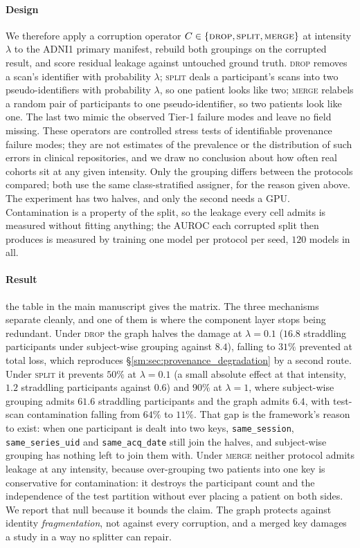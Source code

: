 \documentclass[11pt]{article}
\begin{document}
\paragraph{Design}
We therefore apply a corruption operator
$C \in \{\textsc{drop}, \textsc{split}, \textsc{merge}\}$ at intensity
$\lambda$ to the ADNI1 primary manifest, rebuild both groupings on the
corrupted result, and score residual leakage against untouched ground truth.
\textsc{drop} removes a scan's identifier with probability $\lambda$;
\textsc{split} deals a participant's scans into two pseudo-identifiers with
probability $\lambda$, so one patient looks like two; \textsc{merge}
relabels a random pair of participants to one pseudo-identifier, so two
patients look like one. The last two mimic the observed Tier-1 failure modes
and leave no field missing. These operators are controlled stress tests
of identifiable provenance failure modes; they are not estimates of the
prevalence or the distribution of such errors in clinical repositories,
and we draw no conclusion about how often real cohorts sit at any given
intensity. Only the grouping differs between the protocols
compared; both use the same class-stratified assigner, for the reason given
above. The experiment has two halves, and only the second needs a GPU.
Contamination is a property of the split, so the leakage every cell admits
is measured without fitting anything; the AUROC each corrupted split then
produces is measured by training one model per protocol per seed, $120$
models in all.

\paragraph{Result}
the table in the main manuscript gives the matrix. The three mechanisms
separate cleanly, and one of them is where the component
layer stops being redundant. Under \textsc{drop} the graph halves the damage
at $\lambda = 0.1$ ($16.8$ straddling participants under subject-wise
grouping against $8.4$), falling to $31\%$ prevented at total loss, which
reproduces \S\ref{sm:sec:provenance_degradation} by a second route. Under
\textsc{split} it prevents $50\%$ at $\lambda = 0.1$ (a small absolute
effect at that intensity, $1.2$ straddling participants against $0.6$)
and $90\%$ at
$\lambda = 1$, where subject-wise grouping admits $61.6$ straddling
participants and the graph admits $6.4$, with test-scan contamination falling
from $64\%$ to $11\%$. That gap is the framework's reason to exist: when one
participant is dealt into two keys, \texttt{same\_session},
\texttt{same\_series\_uid} and \texttt{same\_acq\_date} still join the
halves, and subject-wise grouping has nothing left to join them with. Under
\textsc{merge} neither protocol admits leakage at any intensity, because
over-grouping two patients into one key is conservative for contamination: it
destroys the participant count and the independence of the test partition
without ever placing a patient on both sides. We report that null because it
bounds the claim. The graph protects against identity \emph{fragmentation},
not against every corruption, and a merged key damages a study in a way no
splitter can repair.
\end{document}
